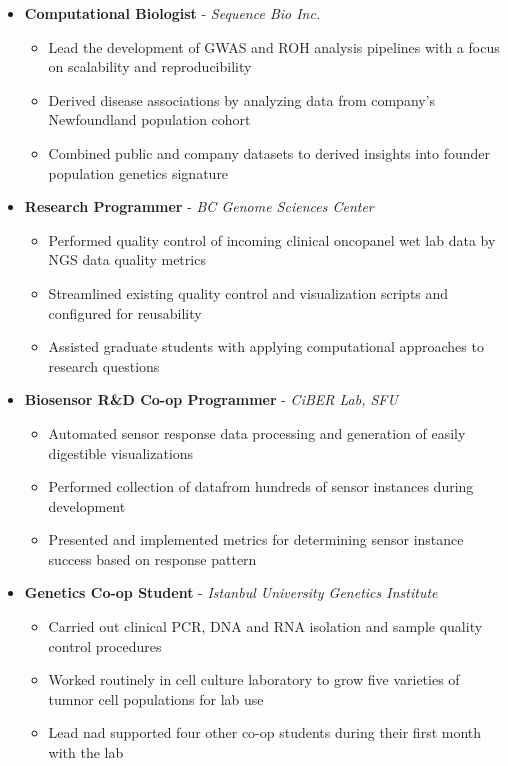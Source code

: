 \documentclass{article}
\begin{document}
\begin{itemize}
  \item[] \textbf{Computational Biologist} - \textit{Sequence Bio Inc.}
    \begin{itemize}
      \item[] Lead the development of GWAS and ROH analysis pipelines with a focus on scalability and reproducibility
      \item[] Derived disease associations by analyzing data from company's Newfoundland population cohort
      \item[] Combined public and company datasets to derived insights into founder population genetics signature
    \end{itemize}
  \item[] \textbf{Research Programmer} - \textit{BC Genome Sciences Center}
    \begin{itemize}
      \item[] Performed quality control of incoming clinical oncopanel wet lab data by NGS data quality metrics
      \item[] Streamlined existing quality control and visualization scripts and configured for reusability
      \item[] Assisted graduate students with applying computational approaches to research questions
    \end{itemize}
  \item[] \textbf{Biosensor R\&D Co-op Programmer} - \textit{CiBER Lab, SFU}
    \begin{itemize}
      \item[] Automated sensor response data processing and generation of easily digestible visualizations
      \item[] Performed collection of datafrom hundreds of sensor instances during development
      \item[] Presented and implemented metrics for determining sensor instance success based on response pattern
    \end{itemize}
  \item[] \textbf{Genetics Co-op Student} - \textit{Istanbul University Genetics Institute}
    \begin{itemize}
      \item[] Carried out clinical PCR, DNA and RNA isolation and sample quality control procedures
      \item[] Worked routinely in cell culture laboratory to grow five varieties of tumnor cell populations for lab use
      \item[] Lead nad supported four other co-op students during their first month with the lab
    \end{itemize}
\end{itemize}
\end{document}
